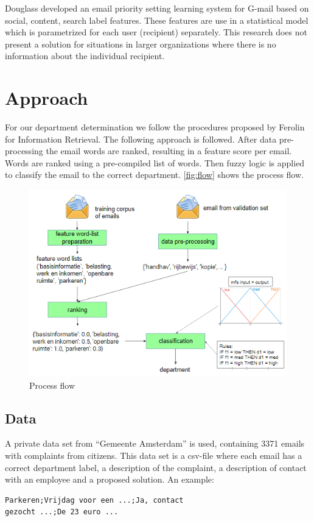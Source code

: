 \documentclass[journal]{IEEEtran}
\begin{document}
Douglass \cite{ranking} developed an email priority setting learning system for G-mail based on social, content, search label features. These features are use in a statistical model which is parametrized for each user (recipient) separately. This research does not present a solution for situations in larger organizations where there is no information about the individual recipient.

\section{Approach}
For our department determination we follow the procedures proposed by Ferolin for Information Retrieval. The following approach is followed. After data pre-processing the email words are ranked, resulting in a feature score per email. Words are ranked using a pre-compiled list of words. Then fuzzy logic is applied to classify the email to the correct department. \autoref{fig:flow} shows the process flow.

\begin{figure}
	\includegraphics[scale=0.6]{res/flow.png}
	\caption{Process flow}
	\label{fig:flow}
\end{figure}

\subsection{Data}

A private data set from ``Gemeente Amsterdam'' is used, containing 3371 emails with complaints from citizens.
This data set is a csv-file where each email has a correct department label, a description of the complaint, a description of contact with an employee and a proposed solution.
An example:
\begin{lstlisting}
Parkeren;Vrijdag voor een ...;Ja, contact
gezocht ...;De 23 euro ...
\end{lstlisting}
\end{document}
